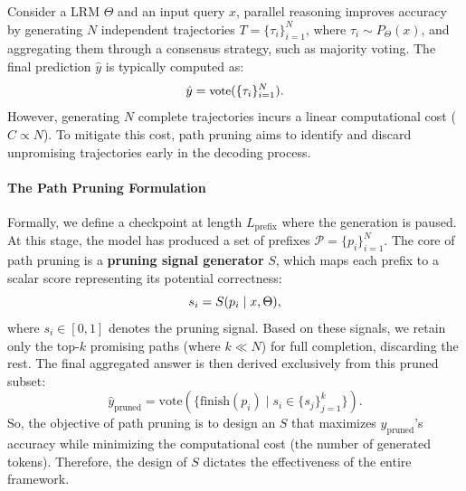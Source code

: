 \documentclass[11pt]{article}
\theoremstyle{plain}
\begin{document}
Consider a LRM $\Theta$ and an input query $x$, parallel reasoning improves accuracy by generating $N$ independent trajectories $T = \{\tau_i\}_{i=1}^N$, where $\tau_i \sim P_{\Theta}(x)$, and aggregating them through a consensus strategy, such as majority voting.
The final prediction $\hat{y}$ is typically computed as:
\begin{equation}\small
    \hat{y} = \text{vote}(\{\tau_i\}_{i=1}^N).
\end{equation}
However, generating $N$ complete trajectories incurs a linear computational cost ($C \propto N$).
To mitigate this cost, path pruning aims to identify and discard unpromising trajectories early in the decoding process.

\paragraph{The Path Pruning Formulation}
Formally, we define a checkpoint at length $L_\text{prefix}$ where the generation is paused.
At this stage, the model has produced a set of prefixes $\mathcal{P} = \{p_i\}_{i=1}^N$.
The core of path pruning is a \textbf{pruning signal generator} $S$, which maps each prefix to a scalar score representing its potential correctness:
\begin{equation}\small
    s_i = S(p_i \mid x, \Theta),
\end{equation}
where $s_i \in [0, 1]$ denotes the pruning signal.
Based on these signals, we retain only the top-$k$ promising paths (where $k \ll N$) for full completion, discarding the rest.
The final aggregated answer is then derived exclusively from this pruned subset:
\begin{equation}
    \hat{y}_\text{pruned} = \text{vote}(\{\text{finish}(p_i) \mid s_i \in \{s_j\}_{j=1}^k\}).
\end{equation}
So, the objective of path pruning is to design an $S$ that maximizes $\hat{y}_\text{pruned}$'s accuracy while minimizing the computational cost (the number of generated tokens).
Therefore, the design of $S$ dictates the effectiveness of the entire framework.
\end{document}

